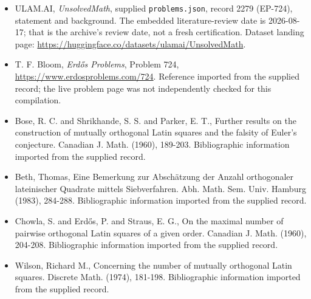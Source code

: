 \documentclass[11pt,a4paper]{article}
\begin{document}
{\small

\begin{itemize}

\item[\hypertarget{source:2279:1}{S1}] ULAM.AI, \emph{UnsolvedMath}, supplied \texttt{problems.json}, record 2279 (EP-724), statement and background. The embedded literature-review date is 2026-08-17; that is the archive’s review date, not a fresh certification. Dataset landing page: \url{https://huggingface.co/datasets/ulamai/UnsolvedMath}.

\item[\hypertarget{source:2279:2}{S2}] T. F. Bloom, \emph{Erdős Problems}, Problem 724, \url{https://www.erdosproblems.com/724}. Reference imported from the supplied record; the live problem page was not independently checked for this compilation.

\item[\hypertarget{source:2279:3}{S3}] Bose, R. C. and Shrikhande, S. S. and Parker, E. T., Further results on the construction of mutually orthogonal Latin squares and the falsity of Euler's conjecture. Canadian J. Math. (1960), 189-203. Bibliographic information imported from the supplied record.

\item[\hypertarget{source:2279:4}{S4}] Beth, Thomas, Eine Bemerkung zur Absch\"{a}tzung der Anzahl orthogonaler lateinischer Quadrate mittels Siebverfahren. Abh. Math. Sem. Univ. Hamburg (1983), 284-288. Bibliographic information imported from the supplied record.

\item[\hypertarget{source:2279:5}{S5}] Chowla, S. and Erd\H{o}s, P. and Straus, E. G., On the maximal number of pairwise orthogonal Latin squares of a given order. Canadian J. Math. (1960), 204-208. Bibliographic information imported from the supplied record.

\item[\hypertarget{source:2279:6}{S6}] Wilson, Richard M., Concerning the number of mutually orthogonal Latin squares. Discrete Math. (1974), 181-198. Bibliographic information imported from the supplied record.

\end{itemize}

}

\label{end:2279}
\end{document}

